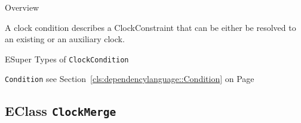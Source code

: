 	\begin{longdescription}
		\item[Overview] 		
				

	

		A clock condition describes a ClockConstraint that can be either be resolved to an existing or an auxiliary clock.		
		\item[ESuper Types of \texttt{ClockCondition}] ~
			\begin{longdescription}
				\item[\texttt{Condition}] see Section~\ref{cls:dependencylanguage::Condition} on Page~\pageref{cls:dependencylanguage::Condition}						\end{longdescription}
		
	
	
	\end{longdescription}
	

\subsection{EClass \bfseries \texttt{ClockMerge}\normalfont}
\label{cls:dependencylanguage::ClockMerge} 
	
